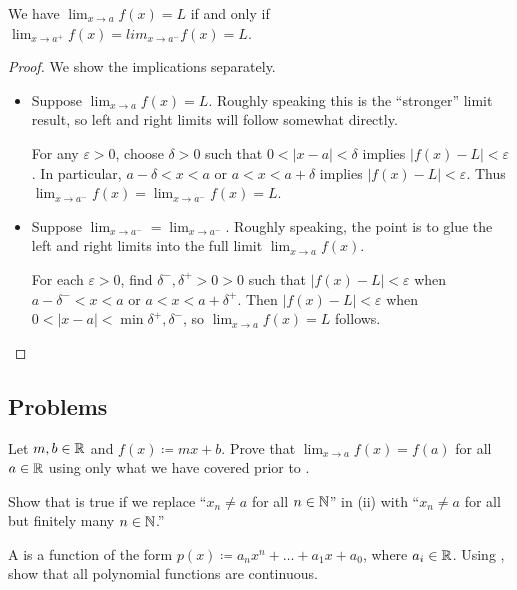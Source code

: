 \documentclass[../notes.tex]{subfiles}
\begin{document}
\begin{proposition}
    We have $\lim_{x\to a}f(x)=L$ if and only if $\lim_{x\to a^+}f(x)=lim_{x\to a^-}f(x)=L$.
\end{proposition}

\begin{proof}
    We show the implications separately.
    \begin{itemize}
        \item Suppose $\lim_{x\to a}f(x)=L$. Roughly speaking this is the ``stronger'' limit result, so left and right limits will follow somewhat directly.
        
        For any $\varepsilon>0$, choose $\delta>0$ such that $0 < |x-a| < \delta$ implies $|f(x)-L| < \varepsilon$. In particular, $a- \delta < x < a$ or $a < x < a + \delta$ implies $|f(x)-L| < \varepsilon$. Thus $\lim_{x\to a^-}f(x)=\lim_{x\to a^-}f(x)=L$.
        \item Suppose $\lim_{x\to a^-}=\lim_{x\to a^-}$. Roughly speaking, the point is to glue the left and right limits into the full limit $\lim_{x\to a}f(x)$.
        
        For each $\varepsilon>0$, find $\delta^-, \delta^+>0>0$ such that $|f(x)-L| < \varepsilon$ when $a-\delta^- < x < a$ or $a < x < a+\delta^+$. Then $|f(x)-L| < \varepsilon$ when $0 < |x-a| < \min{\delta^+, \delta^-}$, so  $\lim_{x\to a}f(x)=L$ follows.
        \qedhere
    \end{itemize}
\end{proof}

\subsection{Problems}

\begin{homework}
    Let $m,b\in \mathbb R$ and $f(x)\coloneqq mx+b$. Prove that $\lim_{x\to a}f(x)=f(a)$ for all $a\in \mathbb R$ {using only what we have covered prior to }. 
\end{homework}

\begin{homework}
     Show that  is true if we replace ``$x_n\neq a$ for all $n\in \mathbb N$'' in (ii) with  ``$x_n\neq a$ for all but finitely many $n\in \mathbb N$.'' 
 \end{homework}


\begin{homework}
    A  is a function of the form $p(x) \coloneqq a_nx^n+\dots + a_1x+a_0$, where $a_i\in \mathbb R$. Using , show that all polynomial functions are continuous. %
\end{homework}
\end{document}
